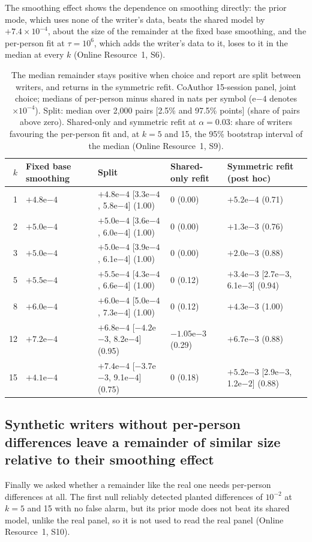 \documentclass[pdflatex,sn-basic]{sn-jnl}
\newcommand{\Sref}[1]{Online Resource~1, S#1}
\begin{document}
The smoothing effect shows the dependence on smoothing directly: the prior mode, which uses none of the writer's data, beats the shared model by $+7.4\times10^{-4}$, about the size of the remainder at the fixed base smoothing, and the per-person fit at $\tau=10^6$, which adds the writer's data to it, loses to it in the median at every $k$ (\Sref{6}).

\begin{table}[t]
\centering
\caption{The median remainder stays positive when choice and report are split between writers, and returns in the symmetric refit. CoAuthor 15-session panel, joint choice; medians of per-person minus shared in nats per symbol (e$-4$ denotes $\times10^{-4}$). Split: median over 2,000 pairs [2.5\% and 97.5\% points] (share of pairs above zero). Shared-only and symmetric refit at $\alpha=0.03$: share of writers favouring the per-person fit and, at $k=5$ and 15, the 95\% bootstrap interval of the median (\Sref{9}).}
\label{tab:smooth}
\setlength{\tabcolsep}{4pt}
\begin{tabular}{@{}r >{\raggedright}p{1.5cm} >{\raggedright}p{3.75cm} l >{\raggedright\arraybackslash}p{2.9cm}@{}}
\toprule
$k$ & Fixed base smoothing & Split & Shared-only refit & Symmetric refit (post hoc) \\
\midrule
1 & $+4.8$e$-4$ & $+4.8$e$-4$ [3.3e$-4$, 5.8e$-4$] (1.00) & 0 (0.00) & $+5.2$e$-4$ (0.71) \\
2 & $+5.0$e$-4$ & $+5.0$e$-4$ [3.6e$-4$, 6.0e$-4$] (1.00) & 0 (0.00) & $+1.3$e$-3$ (0.76) \\
3 & $+5.0$e$-4$ & $+5.0$e$-4$ [3.9e$-4$, 6.1e$-4$] (1.00) & 0 (0.00) & $+2.0$e$-3$ (0.88) \\
5 & $+5.5$e$-4$ & $+5.5$e$-4$ [4.3e$-4$, 6.6e$-4$] (1.00) & 0 (0.12) & $+3.4$e$-3$ [2.7e$-3$, 6.1e$-3$] (0.94) \\
8 & $+6.0$e$-4$ & $+6.0$e$-4$ [5.0e$-4$, 7.3e$-4$] (1.00) & 0 (0.12) & $+4.3$e$-3$ (1.00) \\
12 & $+7.2$e$-4$ & $+6.8$e$-4$ [$-4.2$e$-3$, 8.2e$-4$] (0.95) & $-1.05$e$-3$ (0.29) & $+6.7$e$-3$ (0.88) \\
15 & $+4.1$e$-4$ & $+7.4$e$-4$ [$-3.7$e$-3$, 9.1e$-4$] (0.75) & 0 (0.18) & $+5.2$e$-3$ [2.9e$-3$, 1.2e$-2$] (0.88) \\
\bottomrule
\end{tabular}
\end{table}

\subsection{Synthetic writers without per-person differences leave a remainder of similar size relative to their smoothing effect}\label{sec:res-sens}
Finally we asked whether a remainder like the real one needs per-person differences at all. The first null reliably detected planted differences of $10^{-2}$ at $k=5$ and 15 with no false alarm, but its prior mode does not beat its shared model, unlike the real panel, so it is not used to read the real panel (\Sref{10}).
\end{document}
